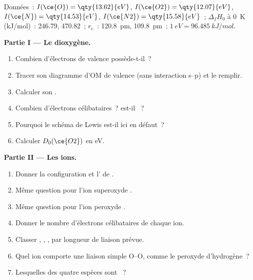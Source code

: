 \begin{problem}
\label{pb:b2:diatomic-mos:1}
Données~: $I(\ce{O}) = \qty{13.62}{eV}$, $I(\ce{O2}) = \qty{12.07}{eV}$, $I(\ce{N}) =
\qty{14.53}{eV}$, $I(\ce{N2}) = \qty{15.58}{eV}$~; $\Delta_f H_0$ à \qty{0}{K}
(\unit{kJ/mol})~:  246.79,  470.82~; $r_e$~:  \qty{120.8}{pm}, 
\qty{109.8}{pm}~; $1\ \unit{eV} = \qty{96.485}{kJ/mol}$.

\medskip
\noindent\textbf{Partie I --- Le dioxygène.}
\begin{enumerate}
  \item Combien d'électrons de valence  possède-t-il~?
  \item Tracer son diagramme d'OM de valence (sans interaction s--p) et le remplir.
  \item Calculer son .
  \item Combien d'électrons célibataires~?  est-il ~?
  \item Pourquoi le schéma de Lewis est-il ici en défaut~?
  \item Calculer $D_0(\ce{O2})$ en \unit{eV}.
\end{enumerate}

\medskip
\noindent\textbf{Partie II --- Les ions.}
\begin{enumerate}[resume]
  \item Donner la configuration et l' de .
  \item Même question pour l'ion superoxyde .
  \item Même question pour l'ion peroxyde .
  \item Donner le nombre d'électrons célibataires de chaque ion.
  \item Classer , , ,  par longueur de liaison prévue.
  \item Quel ion comporte une liaison simple O--O, comme le peroxyde d'hydrogène~?
  \item Lesquelles des quatre espèces sont ~?
\end{enumerate}


\end{problem}
